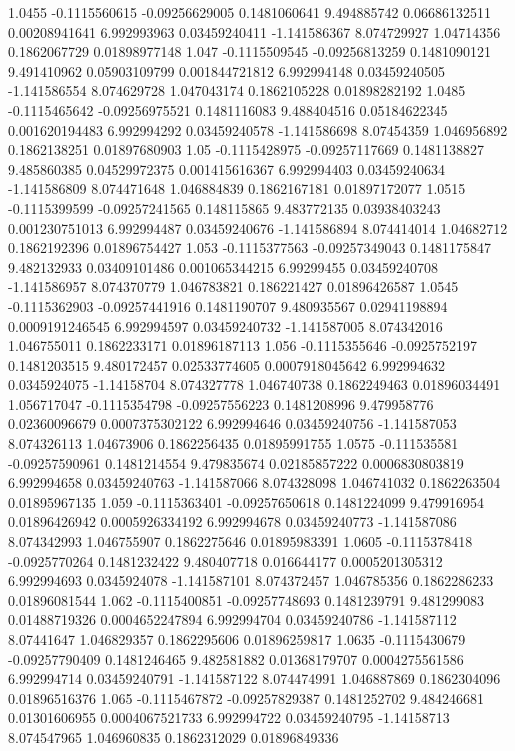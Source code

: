 {1.0455 -0.1115560615 -0.09256629005 0.1481060641 9.494885742 0.06686132511 0.00208941641 6.992993963 0.03459240411 -1.141586367 8.074729927 1.04714356 0.1862067729 0.01898977148
1.047 -0.1115509545 -0.09256813259 0.1481090121 9.491410962 0.05903109799 0.001844721812 6.992994148 0.03459240505 -1.141586554 8.074629728 1.047043174 0.1862105228 0.01898282192
1.0485 -0.1115465642 -0.09256975521 0.1481116083 9.488404516 0.05184622345 0.001620194483 6.992994292 0.03459240578 -1.141586698 8.07454359 1.046956892 0.1862138251 0.01897680903
1.05 -0.1115428975 -0.09257117669 0.1481138827 9.485860385 0.04529972375 0.001415616367 6.992994403 0.03459240634 -1.141586809 8.074471648 1.046884839 0.1862167181 0.01897172077
1.0515 -0.1115399599 -0.09257241565 0.148115865 9.483772135 0.03938403243 0.001230751013 6.992994487 0.03459240676 -1.141586894 8.074414014 1.04682712 0.1862192396 0.01896754427
1.053 -0.1115377563 -0.09257349043 0.1481175847 9.482132933 0.03409101486 0.001065344215 6.99299455 0.03459240708 -1.141586957 8.074370779 1.046783821 0.186221427 0.01896426587
1.0545 -0.1115362903 -0.09257441916 0.1481190707 9.480935567 0.02941198894 0.0009191246545 6.992994597 0.03459240732 -1.141587005 8.074342016 1.046755011 0.1862233171 0.01896187113
1.056 -0.1115355646 -0.0925752197 0.1481203515 9.480172457 0.02533774605 0.0007918045642 6.992994632 0.0345924075 -1.14158704 8.074327778 1.046740738 0.1862249463 0.01896034491
1.056717047 -0.1115354798 -0.09257556223 0.1481208996 9.479958776 0.02360096679 0.0007375302122 6.992994646 0.03459240756 -1.141587053 8.074326113 1.04673906 0.1862256435 0.01895991755
1.0575 -0.111535581 -0.09257590961 0.1481214554 9.479835674 0.02185857222 0.0006830803819 6.992994658 0.03459240763 -1.141587066 8.074328098 1.046741032 0.1862263504 0.01895967135
1.059 -0.1115363401 -0.09257650618 0.1481224099 9.479916954 0.01896426942 0.0005926334192 6.992994678 0.03459240773 -1.141587086 8.074342993 1.046755907 0.1862275646 0.01895983391
1.0605 -0.1115378418 -0.0925770264 0.1481232422 9.480407718 0.016644177 0.0005201305312 6.992994693 0.0345924078 -1.141587101 8.074372457 1.046785356 0.1862286233 0.01896081544
1.062 -0.1115400851 -0.09257748693 0.1481239791 9.481299083 0.01488719326 0.0004652247894 6.992994704 0.03459240786 -1.141587112 8.07441647 1.046829357 0.1862295606 0.01896259817
1.0635 -0.1115430679 -0.09257790409 0.1481246465 9.482581882 0.01368179707 0.0004275561586 6.992994714 0.03459240791 -1.141587122 8.074474991 1.046887869 0.1862304096 0.01896516376
1.065 -0.1115467872 -0.09257829387 0.1481252702 9.484246681 0.01301606955 0.0004067521733 6.992994722 0.03459240795 -1.14158713 8.074547965 1.046960835 0.1862312029 0.01896849336
}
